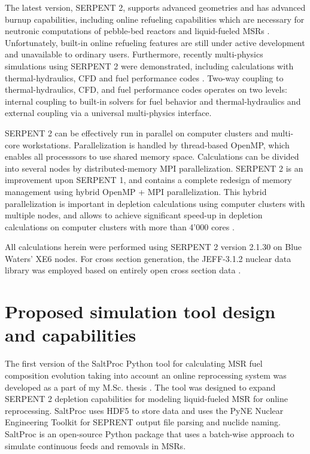 The latest version, SERPENT 2, supports advanced geometries and has advanced burnup capabilities, including online refueling capabilities which are necessary for neutronic computations of pebble-bed reactors and liquid-fueled \glspl{MSR} \cite{aufiero_extended_2013}. Unfortunately, built-in online refueling features are still under active development and unavailable to ordinary users. Furthermore, recently multi-physics simulations using SERPENT 2 were demonstrated, including  calculations with thermal-hydraulics, \gls{CFD} and fuel performance codes \cite{leppanen_numerical_2015}. Two-way coupling to thermal-hydraulics, \gls{CFD}, and fuel performance codes operates on two levels: internal coupling to built-in solvers for fuel behavior and thermal-hydraulics and external coupling via a universal multi-physics interface. 

SERPENT 2 can be effectively run in parallel on computer clusters and multi-core workstations. Parallelization is handled by thread-based OpenMP, which enables all processsors to use shared memory space. Calculations can be divided into several nodes by distributed-memory \gls{MPI} parallelization. SERPENT 2  is an improvement upon SERPENT 1, and contains a complete redesign of memory management using hybrid OpenMP \cite{dagum_openmp_1998} + \gls{MPI} parallelization.  This hybrid parallelization is important in depletion calculations using computer clusters with multiple nodes, and allows to achieve significant speed-up in depletion calculations on computer clusters with more than 4'000 cores \cite{leppanen_serpent_2015}. 

All calculations herein were performed using SERPENT 2 version 2.1.30 on Blue Waters’ XE6 nodes. For cross section generation, the JEFF-3.1.2 nuclear data library was employed based on entirely open cross section data 
\cite{oecd/nea_data_bank_jeff-3.1.2_2014}. 

\section{Proposed simulation tool design and capabilities} \label{sec:tool_design}
The first version of the SaltProc Python tool for calculating \gls{MSR} fuel 
composition evolution taking into account an online reprocessing system 
was developed as a part of my M.Sc. thesis \cite{rykhlevskii_advanced_2018,
rykhlevskii_arfc/saltproc_2018}. The tool was designed to 
expand SERPENT 2 depletion capabilities for modeling liquid-fueled \gls{MSR} 
for online reprocessing. SaltProc uses HDF5 
\cite{the_hdf_group_hierarchical_1997} to store 
data and uses the PyNE Nuclear Engineering Toolkit \cite{scopatz_pyne_2012}
for SEPRENT output file parsing and nuclide naming. SaltProc is an 
open-source Python package that uses a batch-wise approach to simulate 
continuous feeds and removals in \glspl{MSR}. 

